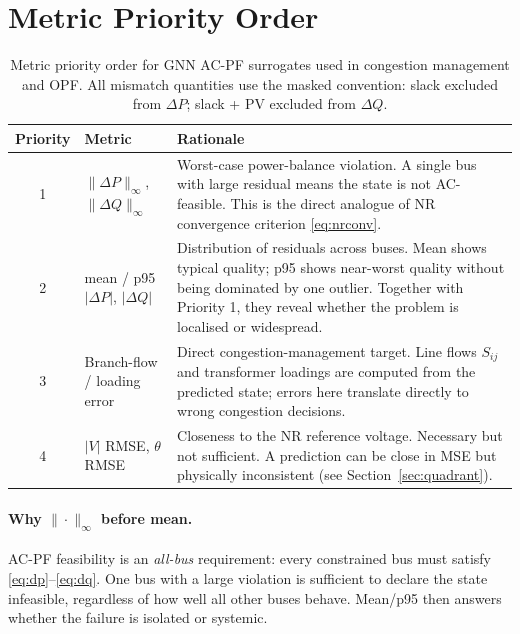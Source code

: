 \documentclass{article}
\begin{document}
\section{Metric Priority Order}

\begin{table}[h]
\centering
\caption{Metric priority order for GNN AC-PF surrogates used in congestion
  management and OPF.  All mismatch quantities use the masked convention:
  slack excluded from $\Delta P$; slack + PV excluded from $\Delta Q$.}
\label{tab:priority}
\begin{tabular}{clp{8cm}}
\toprule
Priority & Metric & Rationale \\
\midrule
1 & $\|\Delta P\|_\infty$, $\|\Delta Q\|_\infty$ &
  Worst-case power-balance violation.  A single bus with large residual
  means the state is not AC-feasible.  This is the direct analogue of
  NR convergence criterion \eqref{eq:nrconv}. \\[4pt]
2 & mean / p95 $|\Delta P|$, $|\Delta Q|$ &
  Distribution of residuals across buses.  Mean shows typical quality;
  p95 shows near-worst quality without being dominated by one outlier.
  Together with Priority 1, they reveal whether the problem is
  localised or widespread. \\[4pt]
3 & Branch-flow / loading error &
  Direct congestion-management target.  Line flows $S_{ij}$ and
  transformer loadings are computed from the predicted state; errors
  here translate directly to wrong congestion decisions. \\[4pt]
4 & $|V|$ RMSE, $\theta$ RMSE &
  Closeness to the NR reference voltage.  Necessary but not sufficient.
  A prediction can be close in MSE but physically inconsistent
  (see Section~\ref{sec:quadrant}). \\
\bottomrule
\end{tabular}
\end{table}

\paragraph{Why $\|\cdot\|_\infty$ before mean.}
AC-PF feasibility is an \emph{all-bus} requirement: every constrained bus
must satisfy \eqref{eq:dp}--\eqref{eq:dq}.  One bus with a large violation
is sufficient to declare the state infeasible, regardless of how well all
other buses behave.  Mean/p95 then answers whether the failure is isolated
or systemic.
\end{document}
